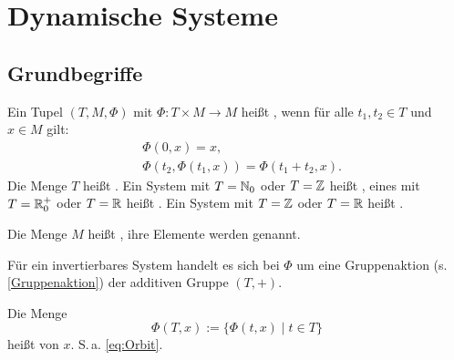 
\chapter{Dynamische Systeme}
\section{Grundbegriffe}

\begin{Definition}
Ein Tupel $(T,M,\Phi)$ mit $\Phi\colon T\times M\to M$ heißt
,
wenn für alle $t_1,t_2\in T$ und $x\in M$ gilt:
\begin{align}
&\Phi(0,x)=x,\\
&\Phi(t_2,\Phi(t_1,x)) = \Phi(t_1+t_2,x).
\end{align}
Die Menge $T$ heißt .
Ein System mit $T=\mathbb N_0$ oder $T=\mathbb Z$ heißt ,
eines mit $T=\mathbb R_0^{+}$ oder $T=\mathbb R$ heißt .
Ein System mit $T=\mathbb Z$ oder $T=\mathbb R$ heißt .

Die Menge $M$ heißt ,
ihre Elemente werden  genannt.
\end{Definition}
Für ein invertierbares System handelt es sich bei $\Phi$
um eine Gruppenaktion (s. \ref{Gruppenaktion})
der additiven Gruppe $(T,+)$.

Die Menge
\begin{equation}
\Phi(T,x) := \{\Phi(t,x)\mid t\in T\}
\end{equation}
heißt  von $x$. S.\,a. \eqref{eq:Orbit}.



